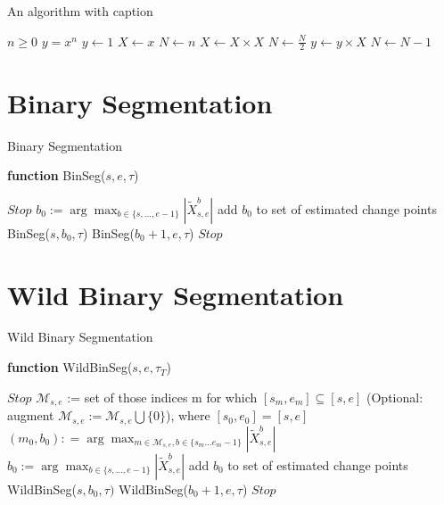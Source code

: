 \documentclass{article}
\begin{document}
\begin{algorithm}
\caption{An algorithm with caption}\label{alg:cap}
\begin{algorithmic}
\Require $n \geq 0$
\Ensure $y = x^n$
\State $y \gets 1$
\State $X \gets x$
\State $N \gets n$
    \State $X \gets X \times X$
    \State $N \gets \frac{N}{2}$  
    \State $y \gets y \times X$
    \State $N \gets N - 1$
\EndIf
\EndWhile
\end{algorithmic}
\end{algorithm}

\section{Binary Segmentation}
\begin{algorithm}
\caption{Binary Segmentation}\label{alg:cap}
\textbf{function} BinSeg($s,e,\tau$)
\begin{algorithmic}
        \State $Stop$
    \Else
        \State$b_{0} := \arg \max_{b \in \{s,...,e-1\}} |\tilde{X}_{s,e}^{b}|$
            \State add $b_0$ to set of estimated change points
            \State BinSeg($s,b_{0},\tau$)
            \State BinSeg($b_{0}+1,e,\tau$)
        \Else
            \State $Stop$
            \EndIf
        \EndIf
\end{algorithmic}
\end{algorithm}

\section{Wild Binary Segmentation}
\begin{algorithm}
\caption{Wild Binary Segmentation}\label{alg:cap}
\textbf{function} WildBinSeg($s,e,\tau_{T}$)
\begin{algorithmic}
        \State $Stop$
    \Else
        \State $\mathcal{M}_{s,e}$ := set of those indices m for which $[s_{m},e_{m}] \subseteq [s,e]$
        \State (Optional: augment $\mathcal{M}_{s,e}:= \mathcal{M}_{s,e}\bigcup \{0\}$), where $[s_{0},e_{0}] = [s,e]$
        \State $(m_{0},b_{0}): = \arg \max_{m \in \mathcal{M}_{s,e}, b \in \{s_{m}...e_{m}-1\}}|\tilde{X}_{s,e}^{b}|$
        \State$b_{0} := \arg \max_{b\in \{s,...,e-1\}} | \tilde{X}_{s,e}^{b}|$
            \State add $b_0$ to set of estimated change points
            \State WildBinSeg($s,b_{0},\tau)  $
            \State WildBinSeg($b_{0}+1,e,\tau$)
        \Else
            \State $Stop $
            \EndIf
        \EndIf
\end{algorithmic}
\end{algorithm}
\end{document}
